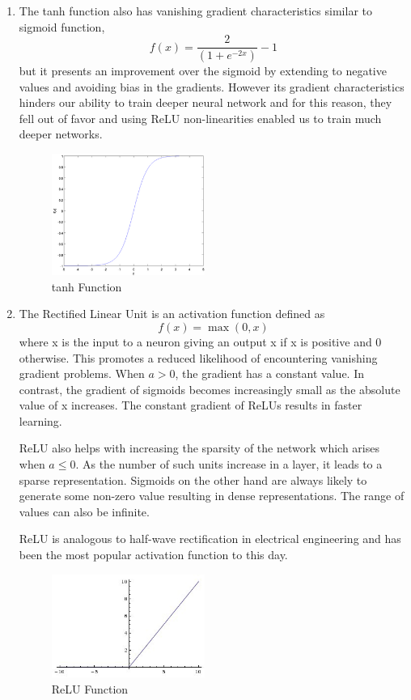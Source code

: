\begin{enumerate}[label=(\alph*)]
\item The tanh function also has vanishing gradient characteristics similar to sigmoid function,
\begin{equation}
    f(x) = \frac{2}{(1+e^{-2x})}-1
\end{equation}
but it presents an improvement over the sigmoid by extending to negative values and avoiding bias in the gradients. 
However its gradient characteristics hinders our ability to train deeper neural network and for this reason, they fell out of favor and using ReLU non-linearities enabled us to train much deeper networks. 

\begin{figure}[ht]
\centering
\includegraphics[width=50mm]{figs/tanh_function.png}
\caption{tanh Function}
\label{fig:tanh}
\end{figure}

\item The Rectified Linear Unit is an activation function defined as 
\begin{equation}
    f(x) = \max (0,x)
\end{equation}
where x is the input to a neuron giving an output x if x is positive and 0 otherwise. 
This promotes a reduced likelihood of encountering vanishing gradient problems. When $a > 0$, the gradient has a constant value. 
In contrast, the gradient of sigmoids becomes increasingly small as the absolute value of x increases.
The constant gradient of ReLUs results in faster learning.

ReLU also helps with increasing the sparsity of the network which arises when $a ≤ 0$. 
As the number of such units increase in a layer, it leads to a sparse representation. 
Sigmoids on the other hand are always likely to generate some non-zero value resulting in dense representations. 
The range of values can also be infinite.

ReLU is analogous to half-wave rectification in electrical engineering and has been the most popular activation function to this day.

\begin{figure}[ht]
\centering
\includegraphics[width=50mm]{figs/ReLU_function.jpg}
\caption{ReLU Function}
\label{fig:relu}
\end{figure}
\end{enumerate}

